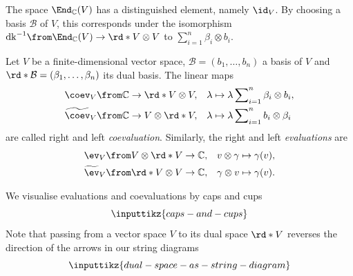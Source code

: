 \documentclass[a4paper,oneside, 12pt]{amsart}
\begin{document}
The space \(\End_{ \mathbb{C}}(V)\) has a distinguished element, namely \(\id_{V}\).
By choosing a basis \(\mathcal{B}\) of \(V\), this corresponds under the isomorphism \(\mathrm{dk}^{-1} \from \End_{ \mathbb{C}}(V) \to \rd*{V} \otimes V\) to \(\sum_{i=1}^{n} \beta_{i}\otimes b_{i}\).
\begin{definition}\label{def:cap-cup}
  Let \(V\) be a finite-dimensional vector space, \(\mathcal{B} =( b_{1}, \dots , b_{n})\) a basis of \(V\) and \(\rd*{\mathcal{B}} = (\beta_{1}, \dots , \beta_{n})\) its dual basis.
  The linear maps
  \begin{subequations}
    \begin{align}
      \coev_{V} &\from \mathbb{C} \to \rd*{V}\otimes V,& \lambda &\mapsto \lambda \sum\nolimits_{i=1}^{n}\beta_{i}\otimes b_{i},\\
      \widetilde{\coev}_{V} &\from \mathbb{C} \to  V\otimes \rd*{V}, &\lambda &\mapsto \lambda \sum\nolimits_{i=1}^{n}b_{i} \otimes \beta_{i}
    \end{align}
  \end{subequations}
  are called right and left \emph{coevaluation}.
  Similarly, the right and left \emph{evaluations} are
  \begin{subequations}
    \begin{align}
      \ev_{V} &\from V\otimes \rd*{V} \to \mathbb{C}, &v \otimes \gamma& \mapsto \gamma(v),  \\
      \widetilde{\ev}_{V} &\from \rd*{V} \otimes V \to \mathbb{C}, &\gamma\otimes v &\mapsto \gamma(v).
    \end{align}
  \end{subequations}
\end{definition}


We visualise evaluations and coevaluations by caps and cups
\begin{equation*}
  \inputtikz{caps-and-cups}
\end{equation*}
Note that passing from a vector space \(V\) to its dual space \(\rd*{V}\) reverses the direction of the arrows in our string diagrams
\begin{equation*}
  \inputtikz{dual-space-as-string-diagram}
\end{equation*}
\end{document}
